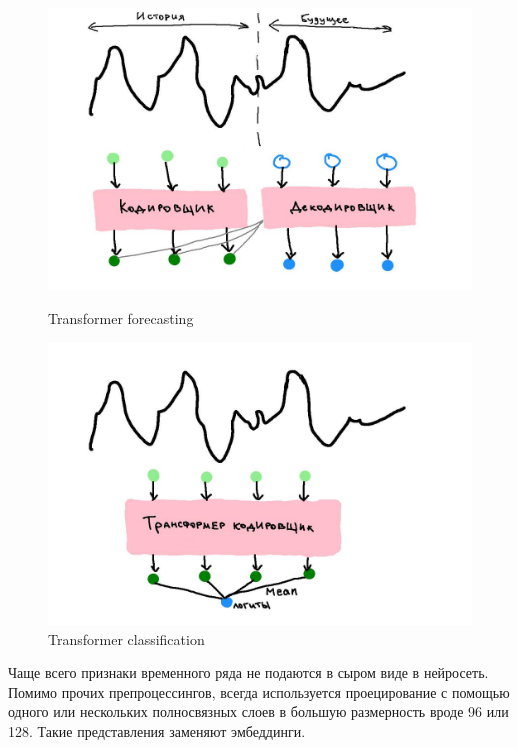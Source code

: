\documentclass[12pt,fleqn]{article}
\begin{document}
\begin{figure}[!htb]
    \centering
    \begin{minipage}{0.45\linewidth}
        \centering
        \includegraphics[width=\linewidth]{illustrations/transformer-forecasting.jpg}
        \caption{Transformer forecasting}
        \label{fig:mlp-forecasting}
    \end{minipage}
    \begin{minipage}{0.45\linewidth}
        \centering
        \includegraphics[width=\linewidth]{illustrations/transformer-clf.jpg}
        \caption{Transformer classification}
        \label{fig:mlp-classification}
    \end{minipage}
\end{figure}


Чаще всего признаки временного ряда не подаются в сыром виде в нейросеть. Помимо прочих препроцессингов, всегда используется проецирование с помощью одного или нескольких полносвязных слоев в большую размерность вроде 96 или 128. Такие представления заменяют эмбеддинги.
\end{document}
